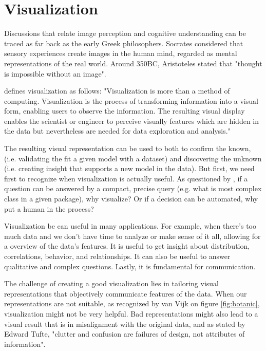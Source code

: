 \chapter{Visualization} \label{sec:visualization}

Discussions that relate image perception and cognitive understanding can be traced as far back as the early Greek philosophers. Socrates considered that sensory experiences create images in the human mind, regarded as mental representations of the real world. Around 350BC, Aristoteles stated that "thought is impossible without an image".

\citet{ref:gershon94} defines visualization as follows: "Visualization is more than a method of computing. Visualization is the process of transforming information into a visual form, enabling users to observe the information. The resulting visual display enables the scientist or engineer to perceive visually features which are hidden in the data but nevertheless are needed for data exploration and analysis."

The resulting visual representation can be used to both to confirm the known, (i.e. validating the fit a given model with a dataset) and discovering the unknown (i.e. creating insight that supports a new model in the data). But first, we need first to recognize when visualization is actually useful. As questioned by \citet{ref:scivis}, if a question can be answered by a compact, precise query (e.g. what is most complex class in a given package), why visualize? Or if a decision can be automated, why put a human in the process?

Visualization be can useful in many applications. For example, when there's too much data and we don't have time to analyze or make sense of it all, allowing for a overview of the data's features. It is useful to get insight about distribution, correlations, behavior, and relationships. It can also be useful to answer qualitative and complex questions. Lastly, it is fundamental for communication.

The challenge of creating a good visualization lies in tailoring visual representations that objectively communicate features of the data. When our representations are not suitable, as recognized by van Vijk on figure \ref{fig:botanic}, visualization might not be very helpful. Bad representations might also lead to a visual result that is in misalignment with the original data, and as stated by Edward Tufte, "clutter and confusion are failures of design, not attributes of information".

